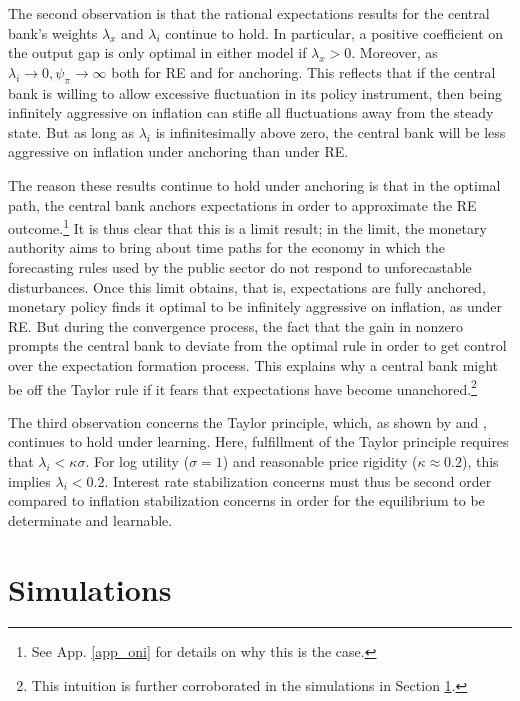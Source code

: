 \documentclass[11pt]{article}
\renewcommand{\[}{\begin{equation}}
\renewcommand{\]}{\end{equation}}
\begin{document}
The second observation is that the rational expectations results for the central bank's weights $\lambda_x$ and $\lambda_i$ continue to hold. In particular, a positive coefficient on the output gap is only optimal in either model if $\lambda_x > 0$. Moreover, as $\lambda_i \rightarrow 0, \psi_{\pi} \rightarrow \infty$ both for RE and for anchoring. This reflects that if the central bank is willing to allow excessive fluctuation in its policy instrument, then being infinitely aggressive on inflation can stifle all fluctuations away from the steady state. But as long as $\lambda_i$ is infinitesimally above zero, the central bank will be less aggressive on inflation under anchoring than under RE. 

The reason these results continue to hold under anchoring is that in the optimal path, the central bank anchors expectations in order to approximate the RE outcome.\footnote{See App. \ref{app_oni} for details on why this is the case.} It is thus clear that this is a limit result; in the limit, the monetary authority aims to bring about time paths for the economy in which the forecasting rules used by the public sector do not respond to unforecastable disturbances. Once this limit obtains, that is, expectations are fully anchored, monetary policy finds it optimal to be infinitely aggressive on inflation, as under RE. But during the convergence process, the fact that the gain in nonzero prompts the central bank to deviate from the optimal rule in order to get control over the expectation formation process. This explains why a central bank might be off the Taylor rule if it fears that expectations have become unanchored.\footnote{This intuition is further corroborated in the simulations in Section \ref{results_sim}.} 

The third observation concerns the Taylor principle, which, as shown by \cite{bullard2002learning} and \cite{preston2005}, continues to hold under learning. Here, fulfillment of the Taylor principle requires that $\lambda_i < \kappa\sigma$. For log utility ($\sigma=1$) and reasonable price rigidity ($\kappa \approx 0.2$), this implies $\lambda_i < 0.2$. Interest rate stabilization concerns must thus be second order compared to inflation stabilization concerns in order for the equilibrium to be determinate and learnable.

\section{Simulations}\label{results_sim}
\end{document}
